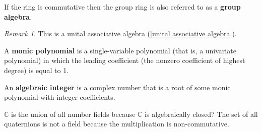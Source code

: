 \documentclass[12pt, letterpaper]{article}
\newcommand{\co}{\mathbb{C}}
\newcommand{\red}[1]{{\color{red} #1}}
\theoremstyle{definition}
\theoremstyle{remark}
\newtheorem*{rem*}{Remark}
\theoremstyle{definition}
\theoremstyle{plain}
\numberwithin{equation}{section}
\begin{document}
	\begin{def*}
		If the ring is commutative then the group ring is also referred to as a \textbf{group algebra}.
	\end{def*}
	\begin{rem*}
		This is a unital associative algebra (\ref{unital associative algebra}).
	\end{rem*}

	\begin{def*}
		A \textbf{monic polynomial} is a single-variable polynomial (that is, a univariate polynomial) in which the leading coefficient (the nonzero coefficient of highest degree) is equal to 1.
	\end{def*}
	\begin{def*}
		An \textbf{algebraic integer} is a complex number that is a root of some monic polynomial with integer coefficients.
	\end{def*}

	\red{$\co$ is the union of all number fields because $\co$ is algebraically closed?}
	The set of all quaternions is not a field because the multiplication is non-commutative.
	
\end{document}
